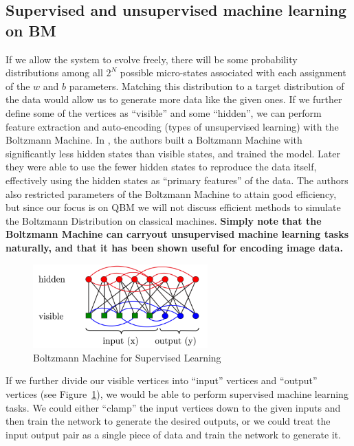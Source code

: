 \documentclass[letterpaper,11pt]{article}
\begin{document}
\subsection{Supervised and unsupervised machine learning on BM} \label{MLonBM}

If we allow the system to evolve freely, there will be some probability distributions among all $2^{N}$ possible micro-states associated with each assignment of the $w$ and $b$ parameters. Matching this distribution to a target distribution of the data would allow us to generate more data like the given ones. If we further define some of the vertices as ``visible'' and some ``hidden'', we can perform feature extraction and auto-encoding (types of unsupervised learning) with the Boltzmann Machine. In \cite{ScienceRBM}, the authors built a Boltzmann Machine with significantly less hidden states than visible states, and trained the model. Later they were able to use the fewer hidden states to reproduce the data itself, effectively using the hidden states as ``primary features'' of the data. The authors also restricted parameters of the Boltzmann Machine to attain good efficiency, but since our focus is on QBM we will not discuss efficient methods to simulate the Boltzmann Distribution on classical machines. \textbf{Simply note that the Boltzmann Machine can carryout unsupervised machine learning tasks naturally, and that it has been shown useful for encoding image data.} \par

\begin{figure}[h] 
\includegraphics[width=0.6\textwidth]{FIG2.png}
\centering
\caption{Boltzmann Machine for Supervised Learning}
\label{fig2}
\end{figure}

If we further divide our visible vertices into ``input'' vertices and ``output'' vertices (see Figure~\ref{fig2}), we would be able to perform supervised machine learning tasks. We could either ``clamp'' the input vertices down to the given inputs and then train the network to generate the desired outputs, or we could treat the input output pair as a single piece of data and train the network to generate it. 
\end{document}
